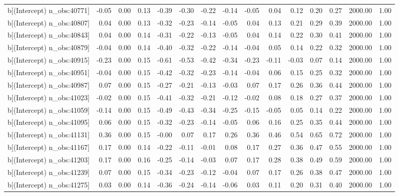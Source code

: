 \begin{table}[ht]
\begin{tabular}{rrrrrrrrrrrrrrr}
  b[(Intercept) n\_obs:40771] & -0.05 & 0.00 & 0.13 & -0.39 & -0.30 & -0.22 & -0.14 & -0.05 & 0.04 & 0.12 & 0.20 & 0.27 & 2000.00 & 1.00 \\ 
  b[(Intercept) n\_obs:40807] & 0.04 & 0.00 & 0.13 & -0.32 & -0.23 & -0.14 & -0.05 & 0.04 & 0.13 & 0.21 & 0.29 & 0.39 & 2000.00 & 1.00 \\ 
  b[(Intercept) n\_obs:40843] & 0.04 & 0.00 & 0.14 & -0.31 & -0.22 & -0.13 & -0.05 & 0.04 & 0.14 & 0.22 & 0.30 & 0.41 & 2000.00 & 1.00 \\ 
  b[(Intercept) n\_obs:40879] & -0.04 & 0.00 & 0.14 & -0.40 & -0.32 & -0.22 & -0.14 & -0.04 & 0.05 & 0.14 & 0.22 & 0.32 & 2000.00 & 1.00 \\ 
  b[(Intercept) n\_obs:40915] & -0.23 & 0.00 & 0.15 & -0.61 & -0.53 & -0.42 & -0.34 & -0.23 & -0.11 & -0.03 & 0.07 & 0.14 & 2000.00 & 1.00 \\ 
  b[(Intercept) n\_obs:40951] & -0.04 & 0.00 & 0.15 & -0.42 & -0.32 & -0.23 & -0.14 & -0.04 & 0.06 & 0.15 & 0.25 & 0.32 & 2000.00 & 1.00 \\ 
  b[(Intercept) n\_obs:40987] & 0.07 & 0.00 & 0.15 & -0.27 & -0.21 & -0.13 & -0.03 & 0.07 & 0.17 & 0.26 & 0.36 & 0.44 & 2000.00 & 1.00 \\ 
  b[(Intercept) n\_obs:41023] & -0.02 & 0.00 & 0.15 & -0.41 & -0.32 & -0.21 & -0.12 & -0.02 & 0.08 & 0.18 & 0.27 & 0.37 & 2000.00 & 1.00 \\ 
  b[(Intercept) n\_obs:41059] & -0.14 & 0.00 & 0.15 & -0.49 & -0.43 & -0.34 & -0.25 & -0.15 & -0.05 & 0.05 & 0.14 & 0.22 & 2000.00 & 1.00 \\ 
  b[(Intercept) n\_obs:41095] & 0.06 & 0.00 & 0.15 & -0.32 & -0.23 & -0.14 & -0.05 & 0.06 & 0.16 & 0.25 & 0.35 & 0.44 & 2000.00 & 1.00 \\ 
  b[(Intercept) n\_obs:41131] & 0.36 & 0.00 & 0.15 & -0.00 & 0.07 & 0.17 & 0.26 & 0.36 & 0.46 & 0.54 & 0.65 & 0.72 & 2000.00 & 1.00 \\ 
  b[(Intercept) n\_obs:41167] & 0.17 & 0.00 & 0.14 & -0.22 & -0.11 & -0.01 & 0.08 & 0.17 & 0.27 & 0.36 & 0.47 & 0.55 & 2000.00 & 1.00 \\ 
  b[(Intercept) n\_obs:41203] & 0.17 & 0.00 & 0.16 & -0.25 & -0.14 & -0.03 & 0.07 & 0.17 & 0.28 & 0.38 & 0.49 & 0.59 & 2000.00 & 1.00 \\ 
  b[(Intercept) n\_obs:41239] & 0.07 & 0.00 & 0.15 & -0.34 & -0.23 & -0.12 & -0.04 & 0.07 & 0.17 & 0.26 & 0.38 & 0.47 & 2000.00 & 1.00 \\ 
  b[(Intercept) n\_obs:41275] & 0.03 & 0.00 & 0.14 & -0.36 & -0.24 & -0.14 & -0.06 & 0.03 & 0.11 & 0.20 & 0.31 & 0.40 & 2000.00 & 1.00 \\ 

\end{tabular}
\end{table}

